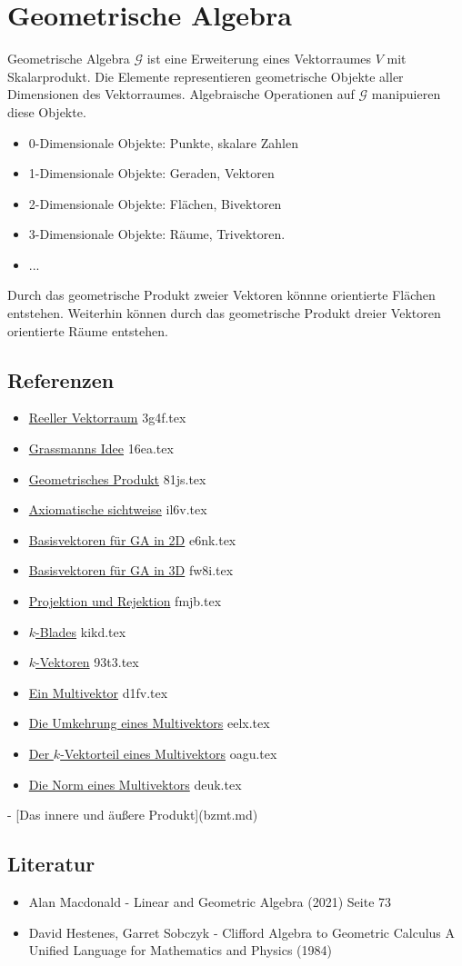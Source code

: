 \documentclass{sajzk}
\begin{document}
\section{Geometrische Algebra}
\label{f35d}

Geometrische Algebra $\mathscr{G}$ ist eine Erweiterung eines Vektorraumes $V$
mit Skalarprodukt. Die Elemente representieren geometrische Objekte aller
Dimensionen des Vektorraumes. Algebraische Operationen auf $\mathscr{G}$
manipuieren diese Objekte.

\begin{itemize}
    \item 0-Dimensionale Objekte: Punkte, skalare Zahlen
    \item 1-Dimensionale Objekte: Geraden, Vektoren
    \item 2-Dimensionale Objekte: Flächen, Bivektoren
    \item 3-Dimensionale Objekte: Räume, Trivektoren.
    \item ...
\end{itemize}

Durch das geometrische Produkt zweier Vektoren könnne orientierte Flächen
entstehen. Weiterhin können durch das geometrische Produkt dreier Vektoren
orientierte Räume entstehen.

\subsection{Referenzen}
\begin{itemize}
    \item \href{3g4f.pdf}{Reeller Vektorraum} 3g4f.tex
    \item \href{16ea.pdf}{Grassmanns Idee} 16ea.tex
    \item \href{81js.pdf}{Geometrisches Produkt} 81js.tex
    \item \href{il6v.pdf}{Axiomatische sichtweise} il6v.tex
    \item \href{e6nk.pdf}{Basisvektoren für GA in 2D} e6nk.tex
    \item \href{fw8i.pdf}{Basisvektoren für GA in 3D} fw8i.tex
    \item \href{fmjb.pdf}{Projektion und Rejektion} fmjb.tex
    \item \href{kikd.pdf}{$k$-Blades} kikd.tex
    \item \href{93t3.pdf}{$k$-Vektoren} 93t3.tex
    \item \href{d1fv.pdf}{Ein Multivektor} d1fv.tex
    \item \href{eelx.pdf}{Die Umkehrung eines Multivektors} eelx.tex
    \item \href{oagu.pdf}{Der $k$-Vektorteil eines Multivektors} oagu.tex
    \item \href{deuk.pdf}{Die Norm eines Multivektors} deuk.tex
\end{itemize}
- [Das innere und äußere Produkt](bzmt.md)

\subsection{Literatur}
\begin{itemize}
    \item Alan Macdonald - Linear and Geometric Algebra (2021) Seite 73
    \item David Hestenes, Garret Sobczyk - Clifford Algebra to Geometric Calculus A Unified Language for Mathematics and Physics (1984)
\end{itemize}
\end{document}
